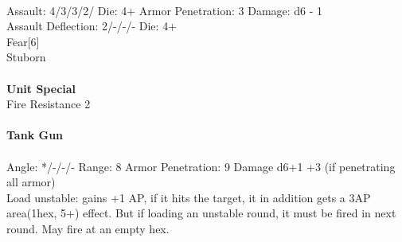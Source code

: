 \ \\
Assault: 4/3/3/2/ Die: 4+ Armor Penetration: 3 Damage: d6 - 1 \\
Assault Deflection: 2/-/-/- Die: 4+\\
\indent Fear[6]\\ Stuborn \\
\ \\

{\bf Unit Special} \\
Fire Resistance 2
\ \\
\ \\
{\bf Tank Gun } \\
\ \\
Angle: */-/-/- Range: 8 Armor Penetration: 9 Damage d6+1 +3 (if penetrating all armor) \\
\indent Load unstable: gains +1 AP, if it hits the target, it in addition gets a 3AP area(1hex, 5+) effect. But if loading an unstable round, it must be fired in next round. May fire at an empty hex. \\





